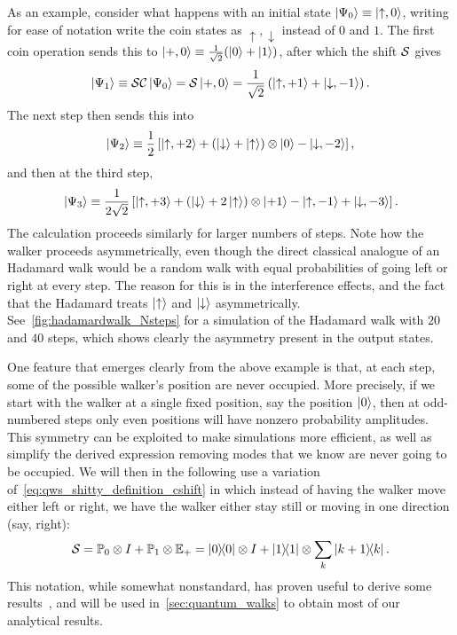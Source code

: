 \begin{example}[label=ex:hadamard_walk]
As an example, consider what happens with an initial state $\ket{\Psi_0}\equiv\ket{\uparrow,0}$, writing for ease of notation write the coin states as $\uparrow,\downarrow$ instead of $0$ and $1$.
The first coin operation sends this to $\ket{+,0}\equiv\frac{1}{\sqrt2}(\ket0+\ket1)$, after which the shift $\mathcal{S}$ gives
\begin{equation}
    \ket{\Psi_1} \equiv 
    \mathcal{S}\mathcal{C}\ket{\Psi_0} =
    \mathcal{S}\ket{+,0} =
    \frac{1}{\sqrt2} \left( \ket{\uparrow,+1} + \ket{\downarrow, -1} \right).
\end{equation}
The next step then sends this into
\begin{equation}
    \ket{\Psi_2} \equiv
    \frac12\left[
        \ket{\uparrow,+2} +
        (\ket{\downarrow}
        + \ket{\uparrow})\otimes \ket{0}
        - \ket{\downarrow, -2}
    \right],
\end{equation}
and then at the third step,
\begin{equation}
    \ket{\Psi_3} \equiv
    \frac{1}{2\sqrt2}\left[
        \ket{\uparrow,+3} +
        (\ket{\downarrow} + 2\ket{\uparrow})\otimes \ket{+1}
        - \ket{\uparrow,-1}
        + \ket{\downarrow,-3}
    \right].
\end{equation}
The calculation proceeds similarly for larger numbers of steps.
Note how the walker proceeds asymmetrically, even though the direct classical analogue of an Hadamard walk would be a random walk with equal probabilities of going left or right at every step.
The reason for this is in the interference effects, and the fact that the Hadamard treats $\ket\uparrow$ and $\ket\downarrow$ asymmetrically.
See~\cref{fig:hadamardwalk_Nsteps} for a simulation of the Hadamard walk with $20$ and $40$ steps, which shows clearly the asymmetry present in the output states.
\end{example}

One feature that emerges clearly from the above example is that, at each step, some of the possible walker's position are never occupied. More precisely, if we start with the walker at a single fixed position, say the position $\ket0$, then at odd-numbered steps only even positions will have nonzero probability amplitudes.
This symmetry can be exploited to make simulations more efficient, as well as simplify the derived expression removing modes that we know are never going to be occupied.
We will then in the following use a variation of~\cref{eq:qws_shitty_definition_cshift} in which instead of having the walker move either left or right, we have the walker either stay still or moving in one direction (say, right):
\begin{equation}
    \mathcal{S} = \mathbb{P}_0\otimes I + \mathbb{P}_1\otimes \mathbb{E}_+
    =\ketbra0\otimes I +\ketbra1\otimes\sum_k\ketbra{k+1}{k}.
\end{equation}
This notation, while somewhat nonstandard, has proven useful to derive some results~\cite{hoyer2009faster,montero2013unidirectional,montero2015quantum}, and will be used in~\cref{sec:quantum_walks} to obtain most of our analytical results.

